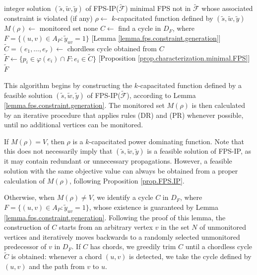 \documentclass{article}
\newcommand{\FF}{{\mathcal F}}
\newcommand{\FPSIP}{FPS-IP\xspace}
\newcommand{\FPSIPF}[1]{FPS-IP(#1)}
\begin{document}
\begin{algorithm}
\caption{Separation of FPS constraints}\label{algo.lazy.separation}
\begin{algorithmic}[1]
\Require integer solution $(\tilde s, \tilde w,\tilde y)$ of \FPSIPF{$\tilde \FF$}
\Ensure minimal FPS not in $\tilde \FF$ whose associated constraint is violated (if any) 
\State $\rho \gets$ $k$-capacitated function defined by $(\tilde s, \tilde w,\tilde y)$
\State $M(\rho) \gets$ monitored set
    \Return none
\EndIf
\State $C \gets$ find a  cycle in $D_{F}$, where $F = \{(u, v) \in A_P: \tilde y_{uv} = 1\}$ [Lemma \ref{lemma.fps.constraint.generation}]
\State $\tilde C = (e_1,\ldots,e_r) \gets $ chordless  cycle obtained from $C$
\State $\tilde F \gets \{p_i \in \varphi(e_i) \cap F: e_i \in \tilde C\}$ [Proposition \ref{prop.characterization.minimal.FPS}]
\State \Return $\tilde F$
\end{algorithmic}
\end{algorithm}

This algorithm begins by constructing the $k$-capacitated function defined by a feasible solution $(\tilde{s}, \tilde{w}, \tilde{y})$ of \FPSIPF{$\tilde \FF$}, according to Lemma \ref{lemma.fps.constraint.generation}. 
The monitored set $M(\rho)$ is then calculated by an iterative procedure that applies rules (DR) and (PR) whenever possible, until no additional vertices can be monitored.

If $M(\rho) = V$, then $\rho$ is a $k$-capacitated power dominating function. 
Note that this does not necessarily imply that $(\tilde{s}, \tilde{w}, \tilde{y})$ is a feasible solution of \FPSIP, as it may contain redundant or unnecessary propagations.
However, a feasible solution with the same objective value can always be obtained from a proper calculation of $M(\rho)$, following Proposition \ref{prop.FPS.IP}.

Otherwise, when $M(\rho) \neq V$, we identify a cycle $C$ in $D_F$, where $F = \{(u,v) \in A_P : \tilde{y}_{uv} = 1\}$, whose existence is guaranteed by Lemma \ref{lemma.fps.constraint.generation}.
Following the proof of this lemma, the construction of $C$ starts from an arbitrary vertex $v$ in the set $N$ of unmonitored vertices and iteratively moves backwards to a randomly selected unmonitored predecessor of $v$ in $D_F$.
If $C$ has chords, we greedily trim $C$ until a chordless cycle $\tilde C$ is obtained: whenever a chord $(u,v)$ is detected, we take the cycle defined by $(u,v)$ and the path from $v$ to $u$.
\end{document}
